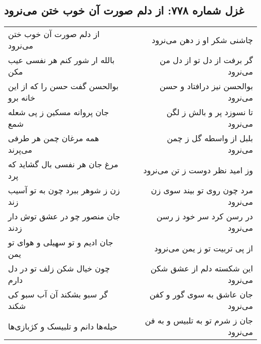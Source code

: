 \begin{center}
\section*{غزل شماره ۷۷۸: از دلم صورت آن خوب ختن می‌نرود}
\label{sec:0778}
\begin{longtable}{l p{0.5cm} r}
از دلم صورت آن خوب ختن می‌نرود
&&
چاشنی شکر او ز دهن می‌نرود
\\
بالله ار شور کنم هر نفسی عیب مکن
&&
گر برفت از دل تو از دل من می‌نرود
\\
بوالحسن گفت حسن را که از این خانه برو
&&
بوالحسن نیز درافتاد و حسن می‌نرود
\\
جان پروانه مسکین ز پی شعله شمع
&&
تا نسوزد پر و بالش ز لگن می‌نرود
\\
همه مرغان چمن هر طرفی می‌پرند
&&
بلبل از واسطه گل ز چمن می‌نرود
\\
مرغ جان هر نفسی بال گشاید که پرد
&&
وز امید نظر دوست ز تن می‌نرود
\\
زن ز شوهر ببرد چون به تو آسیب زند
&&
مرد چون روی تو بیند سوی زن می‌نرود
\\
جان منصور چو در عشق توش دار زدند
&&
در رسن کرد سر خود ز رسن می‌نرود
\\
جان ادیم و تو سهیلی و هوای تو یمن
&&
از پی تربیت تو ز یمن می‌نرود
\\
چون خیال شکن زلف تو در دل دارم
&&
این شکسته دلم از عشق شکن می‌نرود
\\
گر سبو بشکند آن آب سبو کی شکند
&&
جان عاشق به سوی گور و کفن می‌نرود
\\
حیله‌ها دانم و تلبیسک و کژبازی‌ها
&&
جان ز شرم تو به تلبیس و به فن می‌نرود
\\
\end{longtable}
\end{center}
